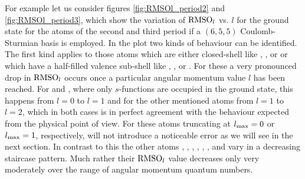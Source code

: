 For example let us consider figures \ref{fig:RMSOl_period2}
and \vref{fig:RMSOl_period3},
which show the variation of $\text{RMSO}_l$ vs. $l$ for the \HF ground state
for the atoms of the second and third period
if a $(6,5,5)$ Coulomb-Sturmian basis is employed.
In the plot two kinds of behaviour can be identified.
The first kind applies to those atoms which are either closed-shell
like , ,  or 
or which have a half-filled valence sub-shell
like , ,  or .
For these a very pronounced drop in $\text{RMSO}_l$ occurs once a particular
angular momentum value $l$ has been reached.
For  and , where only $s$-functions are occupied in the ground state,
this happens from $l=0$ to $l=1$
and for the other mentioned atoms from $l=1$ to $l=2$,
which in both cases is in perfect agreement with the behaviour expected
from the physical point of view.
For these atoms truncating at $l_\text{max} = 0$ or $l_\text{max}=1$, respectively,
will not introduce a noticeable error as we will see in the next section.
In contrast to this the other atoms
, , , , , ,  and 
vary in a decreasing staircase pattern.
Much rather their $\text{RMSO}_l$ value decreases only very moderately over the range
of angular momentum quantum numbers.

